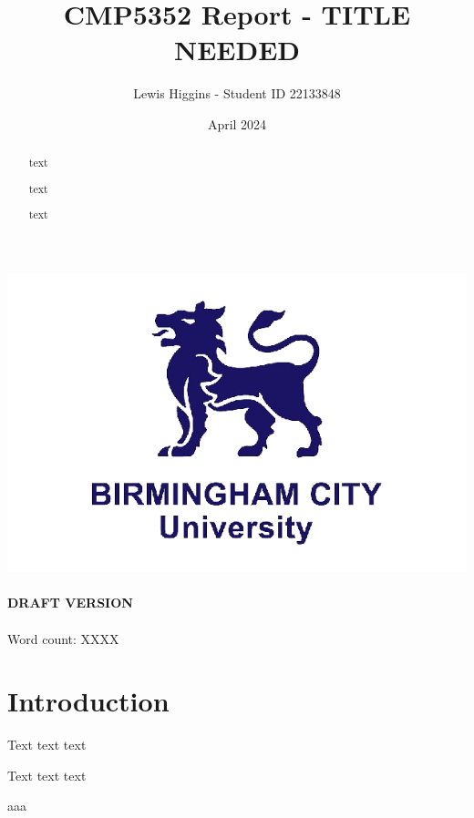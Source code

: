 \documentclass[12pt]{report}
\title{CMP5352 Report - TITLE NEEDED}
\author{Lewis Higgins - Student ID 22133848}
\date{April 2024}
\begin{document}
    \pagecolor{yellow} %

    \makeatletter
    \begin{titlepage}
        \begin{center}
            \includegraphics[width=0.7\linewidth]{bcu logo}\\[4ex]
            {\large \bfseries  \@title }\\[2ex]
            {\large \bfseries  DRAFT VERSION }\\[2ex]
            {\@author}\\[30ex]
            {Word count: XXXX}\\[20ex]
        \end{center}
    \end{titlepage}
    \makeatother
    \thispagestyle{empty}
    \newpage

    \pagecolor{white}

    \begin{abstract}
        text

        text

        text

    \end{abstract}

    \setcounter{page}{0} %

    \tableofcontents
    \thispagestyle{empty}

    \chapter*{Introduction}\label{ch:introduction}

    Text text text

    Text text text

    \pagebreak

    aaa
\end{document}
